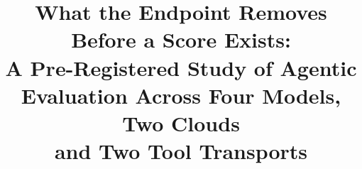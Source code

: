 %
%
\title{What the Endpoint Removes Before a Score Exists:\\
\large A Pre-Registered Study of Agentic Evaluation Across Four Models, Two Clouds\\
\large and Two Tool Transports}

